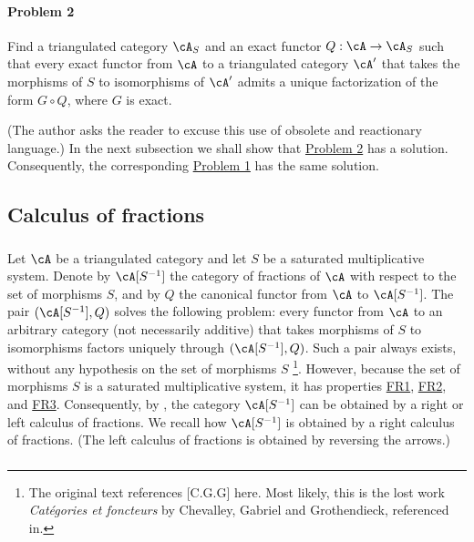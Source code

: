 \documentclass[oneside]{book}
\begin{document}
\paragraph{Problem 2}
\hypertarget{VIII:prob2}{}
Find a triangulated category $\cA_S$ and an exact functor
$Q:\cA\to \cA_S$ such that every exact functor from $\cA$ to a
triangulated category $\cA'$ that takes the morphisms of $S$ to
isomorphisms of $\cA'$ admits a unique factorization of the form
$G\circ Q$, where $G$ is exact.

(The author asks the reader to excuse this use of obsolete and reactionary
language.) In the next subsection we shall show that
\hyperlink{VIII:prob2}{Problem 2} has a solution. Consequently, the
corresponding \hyperlink{VIII:prob1}{Problem 1} has the same solution.

\subsection{Calculus of fractions}\label{VIII:2-3}

\subsubsection{}\label{VIII:2-3-1}

Let $\cA$ be a triangulated category and let $S$ be a saturated
multiplicative system. Denote by $\cA[S^{-1}]$ the category of fractions
of $\cA$ with respect to the set of morphisms $S$, and by $Q$ the
canonical functor from $\cA$ to $\cA[S^{-1}]$. The pair
$(\cA[S^{-1}],Q)$ solves the following problem: every functor from $\cA$
to an arbitrary category (not necessarily additive) that takes morphisms
of $S$ to isomorphisms factors uniquely through $(\cA[S^{-1}],Q)$. Such
a pair always exists, without any hypothesis on the set of morphisms $S$
\cite[1.1]{gz67}\footnote{The original text references [C.G.G] here. Most
likely, this is the lost work \emph{Catégories et foncteurs} by Chevalley,
Gabriel and Grothendieck, referenced in\cite{sc72}. }. However, because the
set of morphisms $S$ is a saturated multiplicative system, it has
properties \hyperlink{VIII:FR1}{FR1}, \hyperlink{VIII:FR2}{FR2}, and
\hyperlink{VIII:FR3}{FR3}. Consequently, by \cite{gz67}, the category
$\cA[S^{-1}]$ can be obtained by a right or left calculus of fractions.
We recall how $\cA[S^{-1}]$ is obtained by a right calculus of fractions.
(The left calculus of fractions is obtained by reversing the arrows.)

\subsubsection{}\label{VIII:2-3-2}
\end{document}
